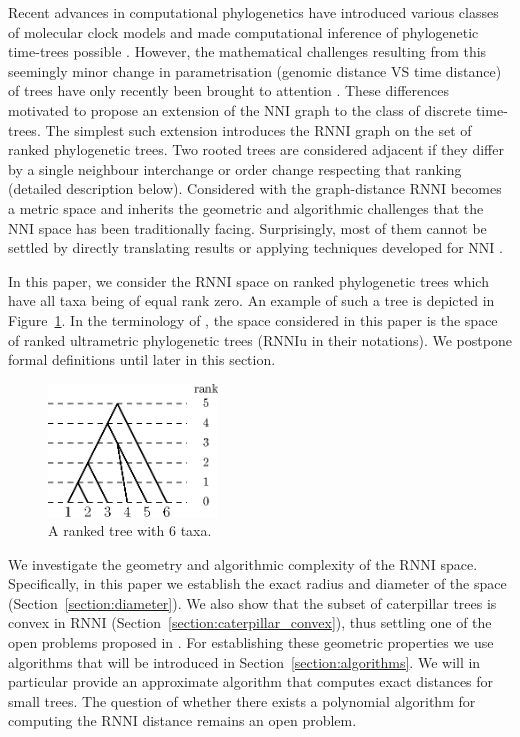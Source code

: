 \documentclass{amsart}
\newcommand{\nni}{\mathrm{NNI}}
\newcommand{\rnni}{\mathrm{RNNI}}
\newcommand{\rnniu}{\mathrm{RNNIu}}
\begin{document}
Recent advances in computational phylogenetics have introduced various classes of molecular clock models \autocite{Yoder2000-ks,Drummond2006-nl,Drummond2010-yf} and made computational inference of phylogenetic time-trees possible \autocite{Ronquist2003-eq, Bouckaert2018-yr, Hadfield2018-xp}.
However, the mathematical challenges resulting from this seemingly minor change in parametrisation (genomic distance VS time distance) of trees have only recently been brought to attention \autocite{Gavryushkin2016-uu}.
These differences motivated \textcite{Gavryushkin2018-ol} to propose an extension of the $\nni$ graph to the class of discrete time-trees.
The simplest such extension introduces the $\rnni$ graph on the set of ranked phylogenetic trees.
Two rooted trees are considered adjacent if they differ by a single neighbour interchange or order change respecting that ranking (detailed description below).
Considered with the graph-distance $\rnni$ becomes a metric space and inherits the geometric and algorithmic challenges that the $\nni$ space has been traditionally facing.
Surprisingly, most of them cannot be settled by directly translating results or applying techniques developed for $\nni$ \autocite{Gavryushkin2018-ol}.

In this paper, we consider the $\rnni$ space on ranked phylogenetic trees which have all taxa being of equal rank zero.
An example of such a tree is depicted in Figure~\ref{fig:ranked_tree}.
In the terminology of \autocite{Gavryushkin2018-ol}, the space considered in this paper is the space of ranked ultrametric phylogenetic trees ($\rnniu$ in their notations).
We postpone formal definitions until later in this section.

\begin{figure}[H]
\centering
\includegraphics[width=0.4\textwidth]{ranked_tree}
\vspace{12pt}
\caption{A ranked tree with $6$ taxa.}
\label{fig:ranked_tree}
\end{figure}

We investigate the geometry and algorithmic complexity of the $\rnni$ space.
Specifically, in this paper we establish the exact radius and diameter of the space (Section~\ref{section:diameter}).
We also show that the subset of caterpillar trees is convex in $\rnni$ (Section~\ref{section:caterpillar_convex}), thus settling one of the open problems proposed in \autocite{Gavryushkin2018-ol}.
For establishing these geometric properties we use algorithms that will be introduced in Section~\ref{section:algorithms}.
We will in particular provide an approximate algorithm that computes exact distances for small trees.
The question of whether there exists a polynomial algorithm for computing the $\rnni$ distance remains an open problem.
\end{document}
